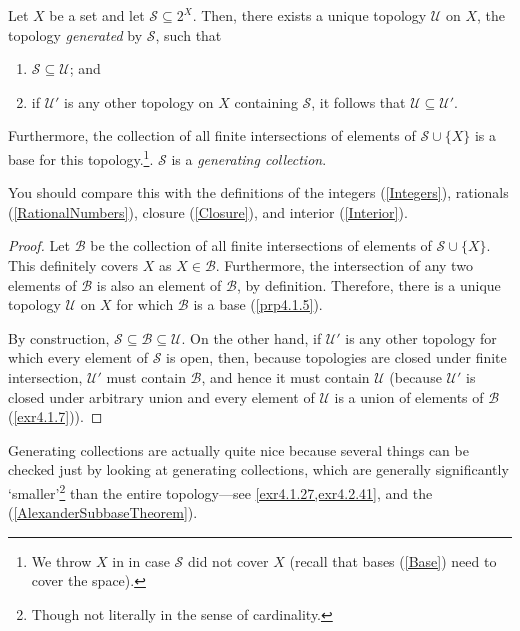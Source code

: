 \begin{prp}\label{GeneratingCollection}
Let $X$ be a set and let $\mathcal{S}\subseteq 2^X$.  Then, there exists a unique topology $\mathcal{U}$ on $X$, the topology \emph{generated} by $\mathcal{S}$, such that
\begin{enumerate}
\item $\mathcal{S}\subseteq \mathcal{U}$; and
\item if $\mathcal{U}'$ is any other topology on $X$ containing $\mathcal{S}$, it follows that $\mathcal{U}\subseteq \mathcal{U}'$.
\end{enumerate}
Furthermore, the collection of all finite intersections of elements of $\mathcal{S}\cup \{ X\}$ is a base for this topology.\footnote{We throw $X$ in in case $\mathcal{S}$ did not cover $X$ (recall that bases (\cref{Base}) need to cover the space).}.  $\mathcal{S}$ is a \emph{generating collection}.
\begin{rmk}
You should compare this with the definitions of the integers (\cref{Integers}), rationals (\cref{RationalNumbers}), closure (\cref{Closure}), and interior (\cref{Interior}).
\end{rmk}
\begin{proof}
Let $\mathcal{B}$ be the collection of all finite intersections of elements of $\mathcal{S}\cup \{ X\}$.  This definitely covers $X$ as $X\in \mathcal{B}$.  Furthermore, the intersection of any two elements of $\mathcal{B}$ is also an element of $\mathcal{B}$, by definition.  Therefore, there is a unique topology $\mathcal{U}$ on $X$ for which $\mathcal{B}$ is a base (\cref{prp4.1.5}).

By construction, $\mathcal{S}\subseteq \mathcal{B}\subseteq \mathcal{U}$.  On the other hand, if $\mathcal{U}'$ is any other topology for which every element of $\mathcal{S}$ is open, then, because topologies are closed under finite intersection, $\mathcal{U}'$ must contain $\mathcal{B}$, and hence it must contain $\mathcal{U}$ (because $\mathcal{U}'$ is closed under arbitrary union and every element of $\mathcal{U}$ is a union of elements of $\mathcal{B}$ (\cref{exr4.1.7})).
\end{proof}
\end{prp}
Generating collections are actually quite nice because several things can be checked just by looking at generating collections, which are generally significantly `smaller'\footnote{Though not literally in the sense of cardinality.} than the entire topology---see \cref{exr4.1.27,exr4.2.41}, and the  (\cref{AlexanderSubbaseTheorem}).

